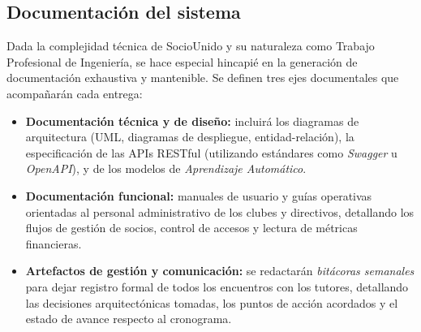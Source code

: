 \subsection{Documentación del sistema}

Dada la complejidad técnica de SocioUnido y su naturaleza como Trabajo Profesional de Ingeniería, se hace especial hincapié en la generación de documentación exhaustiva y mantenible. Se definen tres ejes documentales que acompañarán cada entrega:

\begin{itemize}
    \item \textbf{Documentación técnica y de diseño:} incluirá los diagramas de arquitectura (UML, diagramas de despliegue, entidad-relación), la especificación de las APIs RESTful (utilizando estándares como \textit{Swagger} u \textit{OpenAPI}), y de los modelos de \textit{Aprendizaje Automático}.
    \item \textbf{Documentación funcional:} manuales de usuario y guías operativas orientadas al personal administrativo de los clubes y directivos, detallando los flujos de gestión de socios, control de accesos y lectura de métricas financieras.
    \item \textbf{Artefactos de gestión y comunicación:} se redactarán \textit{bitácoras semanales} para dejar registro formal de todos los encuentros con los tutores, detallando las decisiones arquitectónicas tomadas, los puntos de acción acordados y el estado de avance respecto al cronograma.
\end{itemize}
